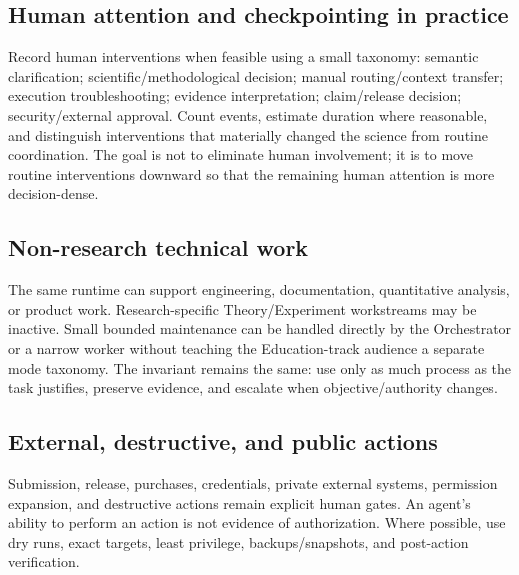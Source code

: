 \documentclass[11pt,a4paper]{article}
\begin{document}
\subsection{Human attention and checkpointing in practice}
Record human interventions when feasible using a small taxonomy: semantic clarification; scientific/methodological decision; manual routing/context transfer; execution troubleshooting; evidence interpretation; claim/release decision; security/external approval. Count events, estimate duration where reasonable, and distinguish interventions that materially changed the science from routine coordination. The goal is not to eliminate human involvement; it is to move routine interventions downward so that the remaining human attention is more decision-dense.

\subsection{Non-research technical work}
The same runtime can support engineering, documentation, quantitative analysis, or product work. Research-specific Theory/Experiment workstreams may be inactive. Small bounded maintenance can be handled directly by the Orchestrator or a narrow worker without teaching the Education-track audience a separate mode taxonomy. The invariant remains the same: use only as much process as the task justifies, preserve evidence, and escalate when objective/authority changes.

\subsection{External, destructive, and public actions}
Submission, release, purchases, credentials, private external systems, permission expansion, and destructive actions remain explicit human gates. An agent's ability to perform an action is not evidence of authorization. Where possible, use dry runs, exact targets, least privilege, backups/snapshots, and post-action verification.
\end{document}
